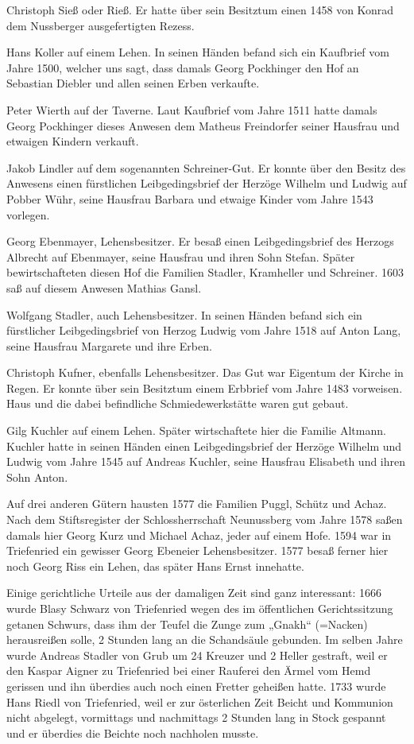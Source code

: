 \documentclass{book}
\begin{document}
Christoph Sieß oder Rieß. Er hatte über sein Besitztum einen 1458 von Konrad dem
Nussberger ausgefertigten Rezess.

Hans Koller auf einem Lehen. In seinen Händen befand sich ein Kaufbrief vom
Jahre 1500, welcher uns sagt, dass damals Georg Pockhinger den Hof an Sebastian
Diebler und allen seinen Erben verkaufte.

Peter Wierth auf der Taverne. Laut Kaufbrief vom Jahre 1511 hatte damals Georg
Pockhinger dieses Anwesen dem Matheus Freindorfer seiner Hausfrau und etwaigen
Kindern verkauft.

Jakob Lindler auf dem sogenannten Schreiner-Gut. Er konnte über den Besitz des
Anwesens einen fürstlichen Leibgedingsbrief der Herzöge Wilhelm und Ludwig auf
Pobber Wühr, seine Hausfrau Barbara und etwaige Kinder vom Jahre 1543 vorlegen.

Georg Ebenmayer, Lehensbesitzer. Er besaß einen Leibgedingsbrief des Herzogs
Albrecht auf Ebenmayer, seine Hausfrau und ihren Sohn Stefan. Später
bewirtschafteten diesen Hof die Familien Stadler, Kramheller und Schreiner. 1603
saß auf diesem Anwesen Mathias Gansl.

Wolfgang Stadler, auch Lehensbesitzer. In seinen Händen befand sich ein
fürstlicher Leibgedingsbrief von Herzog Ludwig vom Jahre 1518 auf Anton Lang,
seine Hausfrau Margarete und ihre Erben.

Christoph Kufner, ebenfalls Lehensbesitzer. Das Gut war Eigentum der Kirche in
Regen. Er konnte über sein Besitztum einem Erbbrief vom Jahre 1483 vorweisen.
Haus und die dabei befindliche Schmiedewerkstätte waren gut gebaut.

Gilg Kuchler auf einem Lehen. Später wirtschaftete hier die Familie Altmann.
Kuchler hatte in seinen Händen einen Leibgedingsbrief der Herzöge Wilhelm und
Ludwig vom Jahre 1545 auf Andreas Kuchler, seine Hausfrau Elisabeth und ihren
Sohn Anton.



Auf drei anderen Gütern hausten 1577 die Familien Puggl, Schütz und Achaz. Nach
dem Stiftsregister der Schlossherrschaft Neunussberg vom Jahre 1578 saßen damals
hier Georg Kurz und Michael Achaz, jeder auf einem Hofe. 1594 war in Triefenried
ein gewisser Georg Ebeneier Lehensbesitzer. 1577 besaß ferner hier noch Georg
Riss ein Lehen, das später Hans Ernst innehatte.

Einige gerichtliche Urteile aus der damaligen Zeit sind ganz interessant: 1666
wurde Blasy Schwarz von Triefenried wegen des im öffentlichen Gerichtssitzung
getanen Schwurs, dass ihm der Teufel die Zunge zum „Gnakh“ (=Nacken)
herausreißen solle, 2 Stunden lang an die Schandsäule gebunden. Im selben Jahre
wurde Andreas Stadler von Grub um 24 Kreuzer und 2 Heller gestraft, weil er den
Kaspar Aigner zu Triefenried bei einer Rauferei den Ärmel vom Hemd gerissen und
ihn überdies auch noch einen Fretter geheißen hatte. 1733 wurde Hans Riedl von
Triefenried, weil er zur österlichen Zeit Beicht und Kommunion nicht abgelegt,
vormittags und nachmittags 2 Stunden lang in Stock gespannt und er überdies die
Beichte noch nachholen musste.
\end{document}
